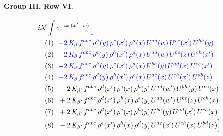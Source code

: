 \documentclass[10pt]{article}
\numberwithin{equation}{section}
\newcommand{\NN}{\mathcal N}
\begin{document}
\paragraph{Group III, Row VI.}
\begin{align*}
&i\NN\int e^{-ik\cdot(w'-w)}\Big[\\
&\quad\text{(1)}\ \ \textcolor{blue}{+2\,K_{\beta}\,f^{abc}\,\rho^{h}(y)\,\rho^{e}(x')\,\rho^{d}(x)\,U^{ad}(w)\,U^{ce}(x')\,U^{bh}(y)}\\
&\quad\text{(2)}\ \ \textcolor{blue}{-2\,K_{\beta}\,f^{abc}\,\rho^{e}(y)\,\rho^{h}(x')\,\rho^{d}(x)\,U^{ad}(w)\,U^{be}(z)\,U^{ch}(x')}\\
&\quad\text{(3)}\ \ \textcolor{blue}{-2\,K_{\beta}\,f^{abc}\,\rho^{h}(y)\,\rho^{e}(x')\,\rho^{d}(x)\,U^{bh}(y)\,U^{ad}(x)\,U^{ce}(x')}\\
&\quad\text{(4)}\ \ \textcolor{blue}{+2\,K_{\beta}\,f^{abc}\,\rho^{d}(y)\,\rho^{h}(x')\,\rho^{e}(x)\,U^{ae}(x)\,U^{ch}(x')\,U^{db}(z)}\\
&\quad\text{(5)}\ \ -2\,K_{\beta'}\,f^{abc}\,\rho^{d}(x')\,\rho^{e}(x)\,\rho^{h}(y)\,U^{ad}(w')\,U^{bh}(y)\,U^{ce}(x)\\
&\quad\text{(6)}\ \ +2\,K_{\beta'}\,f^{abc}\,\rho^{d}(x')\,\rho^{h}(x)\,\rho^{e}(y)\,U^{ad}(w')\,U^{be}(z)\,U^{ch}(x)\\
&\quad\text{(7)}\ \ +2\,K_{\beta'}\,f^{abc}\,\rho^{d}(x')\,\rho^{e}(x)\,\rho^{h}(y)\,U^{bh}(y)\,U^{ad}(x')\,U^{ce}(x)\\
&\quad\text{(8)}\ \ -2\,K_{\beta'}\,f^{abc}\,\rho^{e}(x')\,\rho^{h}(x)\,\rho^{d}(y)\,U^{ae}(x')\,U^{ch}(x)\,U^{bd}(z)\Big]
\end{align*}

\end{document}
